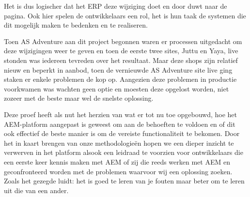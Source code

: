 \documentclass{article}
\begin{document}
	Het is dus logischer dat het ERP deze wijziging doet en door duwt naar de pagina. Ook hier spelen de ontwikkelaars een rol, het is hun taak de systemen die dit mogelijk maken te bedenken en te realiseren.
	\par
	Toen AS Adventure aan dit project begonnen waren er processen uitgedacht om deze wijzigingen weer te geven en toen de eerste twee sites, Juttu en Yaya, live stonden was iedereen tevreden over het resultaat. 
	Maar deze shops zijn relatief nieuw en beperkt in aanbod, toen de vernieuwde AS Adventure site live ging staken er enkele problemen de kop op. Aangezien deze problemen in productie voorkwamen was wachten geen optie en moesten deze opgelost worden, niet zozeer met de beste maar wel de snelste oplossing.
	\par
	Deze proef heeft als nut het herzien van wat er tot nu toe opgebouwd, hoe het AEM-platform aangepast is geweest om aan de behoeften te voldoen en of dit ook effectief de beste manier is om de vereiste functionaliteit te bekomen. Door het in kaart brengen van onze methodologieën hopen we een dieper inzicht te verwerven in het platform alsook een leidraad te voorzien voor ontwikkelaars die een eerste keer kennis maken met AEM of zij die reeds werken met AEM en geconfronteerd worden met de problemen waarvoor wij een oplossing zoeken. 
	Zoals het gezegde luidt: het is goed te leren van je fouten maar beter om te leren uit die van een ander.
\end{document}
